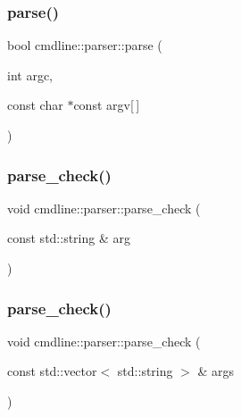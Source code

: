 \subsubsection{\texorpdfstring{parse()}{parse()}\hspace{0.1cm}{\footnotesize\ttfamily [3/3]}}
{\footnotesize\ttfamily bool cmdline\+::parser\+::parse (\begin{DoxyParamCaption}\item[{int}]{argc,  }\item[{const char $\ast$const}]{argv\mbox{[}$\,$\mbox{]} }\end{DoxyParamCaption})\hspace{0.3cm}{\ttfamily [inline]}}

\mbox{\label{classcmdline_1_1parser_af22be174b0ab09f03462c02e9afa03c9}} 
\subsubsection{\texorpdfstring{parse\_check()}{parse\_check()}\hspace{0.1cm}{\footnotesize\ttfamily [1/3]}}
{\footnotesize\ttfamily void cmdline\+::parser\+::parse\+\_\+check (\begin{DoxyParamCaption}\item[{const std\+::string \&}]{arg }\end{DoxyParamCaption})\hspace{0.3cm}{\ttfamily [inline]}}

\mbox{\label{classcmdline_1_1parser_a0829039262c93910a9fee8c80f3edb64}} 
\subsubsection{\texorpdfstring{parse\_check()}{parse\_check()}\hspace{0.1cm}{\footnotesize\ttfamily [2/3]}}
{\footnotesize\ttfamily void cmdline\+::parser\+::parse\+\_\+check (\begin{DoxyParamCaption}\item[{const std\+::vector$<$ std\+::string $>$ \&}]{args }\end{DoxyParamCaption})\hspace{0.3cm}{\ttfamily [inline]}}

